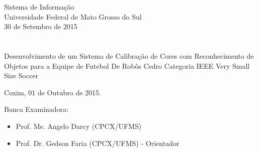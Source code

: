 


\textofree{}



\vskip 0.5cm
\begin{center}
Sistema de Informação\\
Universidade Federal de Mato Grosso do Sul\\
30 de Setembro de 2015
\end{center}


\chapter*{}

\begin{center}

\begin{minipage}[t]{10cm}
	\begin{center}
		\vspace{-2cm}
		{{\Large Desenvolvimento de um Sistema de Calibração de Cores com Reconhecimento de Objetos para a Equipe de Futebol De Robôs Cedro Categoria IEEE Very Small Size Soccer}}  
	\end{center}
\end{minipage}

\end{center}


\begin{flushright}
	\vspace{12cm}
	Coxim, 01 de Outubro de 2015.
\end{flushright}

\vspace{2cm}
Banca Examinadora:

\begin{itemize}
	\item Prof. Me. Angelo Darcy (CPCX/UFMS) 
	\item Prof. Dr. Gedson Faria (CPCX/UFMS) - Orientador
\end{itemize}
